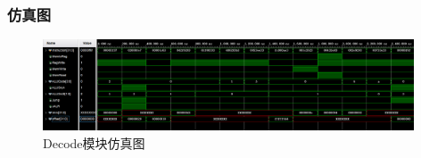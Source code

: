 \documentclass{../source/zjureport}
\begin{document}
            \subsubsection{仿真图}
            \begin{figure}[H]
                \centering
                \includegraphics[width = 0.98\textwidth]{figure/decode.png}
                \caption{Decode模块仿真图}
            \end{figure}
\end{document}
